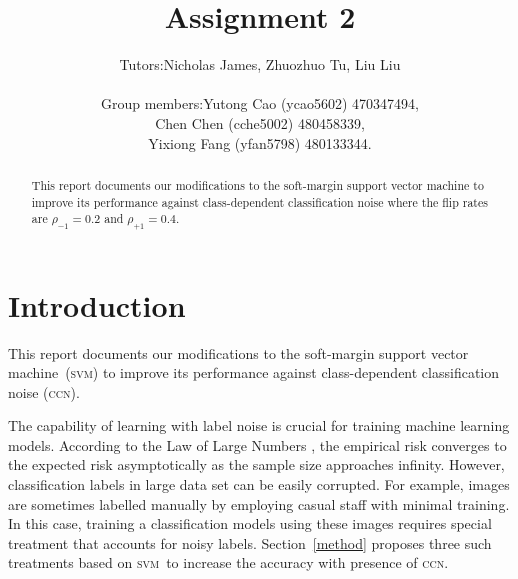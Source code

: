 \documentclass[12pt]{article} %
\title{Assignment 2}
\newcommand{\svm}{\textsc{svm}}
\newcommand{\rhoo}{\rho_{+1}}
\newcommand{\rhoz}{\rho_{-1}}
\begin{document}
\author{%
 \begin{tabular}{rl}
  Tutors:& Nicholas James, Zhuozhuo Tu, Liu Liu\\ \\
Group members: & Yutong Cao (ycao5602) 470347494,\\
& Chen Chen (cche5002) 480458339,\\
& Yixiong Fang (yfan5798) 480133344.
\end{tabular}
}

\maketitle



\begin{abstract}
This report documents our modifications to the soft-margin support vector machine to improve its performance against class-dependent classification noise where the flip rates are $\rhoz=0.2$ and $\rhoo=0.4$.
\end{abstract}
\tableofcontents
\section{Introduction}
This report documents our modifications to the soft-margin support vector machine~(\svm) to improve its performance against class-dependent classification noise (\textsc{ccn}).

The capability of learning with label noise is crucial for training machine learning models. According to the Law of Large Numbers \citep{hardle2007applied}, the empirical risk converges to the expected risk asymptotically as the sample size approaches infinity. However, classification labels in large data set can be easily corrupted. For example, images  are sometimes labelled manually by employing casual staff with minimal training. In this case, training a classification models using these images requires special treatment that accounts for noisy labels. Section~\ref{method} proposes three such treatments based on \svm\ to increase the accuracy with presence of \textsc{ccn}.

\end{document}
